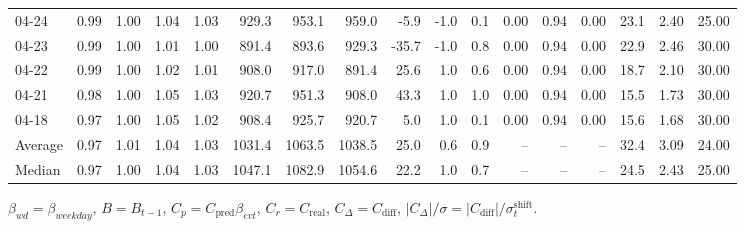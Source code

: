 \begin{threeparttable}
{\begin{tabular}{lrrrrrrrrrrrrrrrr}
  04-24 &         0.99 &           1.00 &          1.04 &          1.03 &  929.3 &  953.1 &  959.0 &       -5.9 &                     -1.0 &                 0.1 &       0.00 &      0.94 &           0.00 &             23.1 &            2.40 &                  25.00 \\
  04-23 &         0.99 &           1.00 &          1.01 &          1.00 &  891.4 &  893.6 &  929.3 &      -35.7 &                     -1.0 &                 0.8 &       0.00 &      0.94 &           0.00 &             22.9 &            2.46 &                  30.00 \\
  04-22 &         0.99 &           1.00 &          1.02 &          1.01 &  908.0 &  917.0 &  891.4 &       25.6 &                      1.0 &                 0.6 &       0.00 &      0.94 &           0.00 &             18.7 &            2.10 &                  30.00 \\
  04-21 &         0.98 &           1.00 &          1.05 &          1.03 &  920.7 &  951.3 &  908.0 &       43.3 &                      1.0 &                 1.0 &       0.00 &      0.94 &           0.00 &             15.5 &            1.73 &                  30.00 \\
  04-18 &         0.97 &           1.00 &          1.05 &          1.02 &  908.4 &  925.7 &  920.7 &        5.0 &                      1.0 &                 0.1 &       0.00 &      0.94 &           0.00 &             15.6 &            1.68 &                  30.00 \\
Average &         0.97 &           1.01 &          1.04 &          1.03 & 1031.4 & 1063.5 & 1038.5 &       25.0 &                      0.6 &                 0.9 &         -- &        -- &             -- &             32.4 &            3.09 &                  24.00 \\
 Median &         0.97 &           1.00 &          1.04 &          1.03 & 1047.1 & 1082.9 & 1054.6 &       22.2 &                      1.0 &                 0.7 &         -- &        -- &             -- &             24.5 &            2.43 &                  25.00 \\
\bottomrule
\end{tabular}
}
\begin{tablenotes}\footnotesize
\item $\beta_{wd}=\beta_{weekday}$, $B=B_{t-1}$,
$C_p=C_{\text{pred}}\beta_{evt}$, $C_r=C_{\text{real}}$,
$C_\Delta=C_{\text{diff}}$, $|C_\Delta|/\sigma=|C_{\text{diff}}|/\sigma_t^{\text{shift}}$.
\end{tablenotes}
\end{threeparttable}
\endgroup
